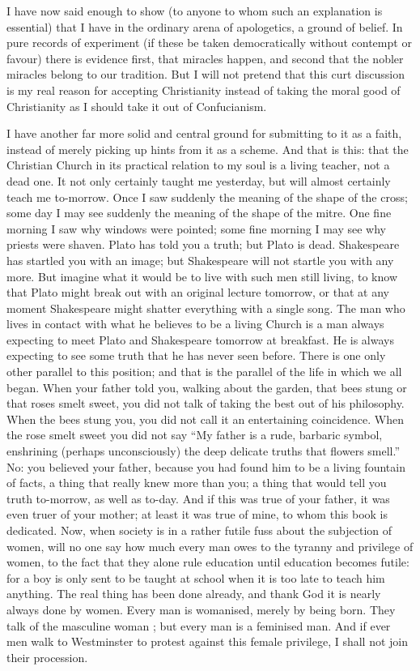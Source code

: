 \documentclass{book}
\begin{document}
I have now said enough to show (to anyone to whom such an explanation is essential) that I have in the ordinary arena of apologetics, a ground of belief. In pure records of experiment (if these be taken democratically without contempt or favour) there is evidence first, that miracles happen, and second that the nobler miracles belong to our tradition. But I will not pretend that this curt discussion is my real reason for accepting Christianity instead of taking the moral good of Christianity as I should take it out of Confucianism.

I have another far more solid and central ground for submitting to it as a faith, instead of merely picking up hints from it as a scheme. And that is this: that the Christian Church in its practical relation to my soul is a living teacher, not a dead one. It not only certainly taught me yesterday, but will almost certainly teach me to-morrow. Once I saw suddenly the meaning of the shape of the cross; some day I may see suddenly the meaning of the shape of the mitre. One fine morning I saw why windows were pointed; some fine morning I may see why priests were shaven. Plato has told you a truth; but Plato is dead. Shakespeare has startled you with an image; but Shakespeare will not startle you with any more. But imagine what it would be to live with such men still living, to know that Plato might break out with an original lecture tomorrow, or that at any moment Shakespeare might shatter everything with a single song. The man who lives in contact with what he believes to be a living Church is a man always expecting to meet Plato and Shakespeare tomorrow at breakfast. He is always expecting to see some truth that he has never seen before. There is one only other parallel to this position; and that is the parallel of the life in which we all began. When your father told you, walking about the garden, that bees stung or that roses smelt sweet, you did not talk of taking the best out of his philosophy. When the bees stung you, you did not call it an entertaining coincidence. When the rose smelt sweet you did not say “My father is a rude, barbaric symbol, enshrining (perhaps unconsciously) the deep delicate truths that flowers smell.” No: you believed your father, because you had found him to be a living fountain of facts, a thing that really knew more than you; a thing that would tell you truth to-morrow, as well as to-day. And if this was true of your father, it was even truer of your mother; at least it was true of mine, to whom this book is dedicated. Now, when society is in a rather futile fuss about the subjection of women, will no one say how much every man owes to the tyranny and privilege of women, to the fact that they alone rule education until education becomes futile: for a boy is only sent to be taught at school when it is too late to teach him anything. The real thing has been done already, and thank God it is nearly always done by women. Every man is womanised, merely by being born. They talk of the masculine woman ; but every man is a feminised man. And if ever men walk to Westminster to protest against this female privilege, I shall not join their procession.
\end{document}
